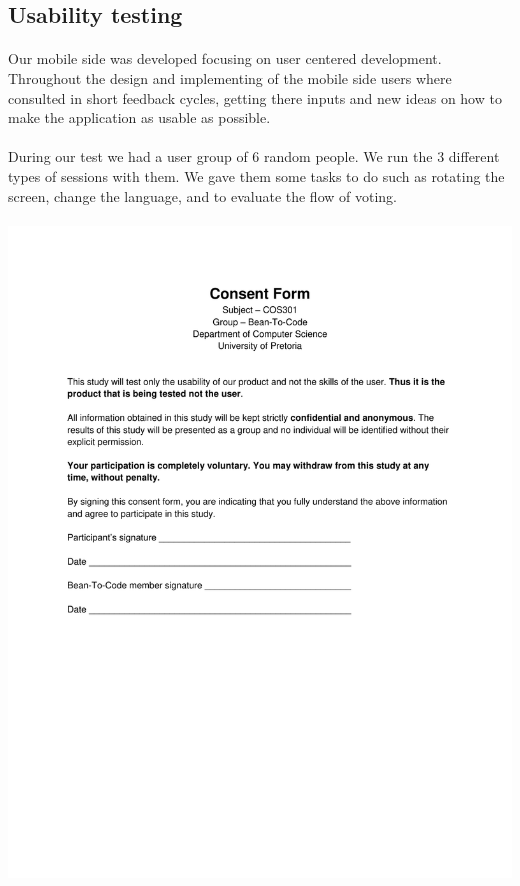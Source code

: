 \documentclass[10pt,a4paper]{article}
\begin{document}
\subsection{Usability testing}
\paragraph{}Our mobile side was developed focusing on user centered development. Throughout the design and implementing of the mobile side users where consulted in short feedback cycles, getting there inputs and new ideas on how to make the application as usable as possible.
\paragraph{}
During our test we had a user group of 6 random people. We run the 3 different types of sessions with them. We gave them some tasks to do such as rotating the screen, change the language, and to evaluate the flow of voting. 
\paragraph{} 
\advance\leftskip-1.3cm
\includegraphics[scale=0.55]{Pictures/ConsentForm.pdf}
\pagebreak
\end{document}
